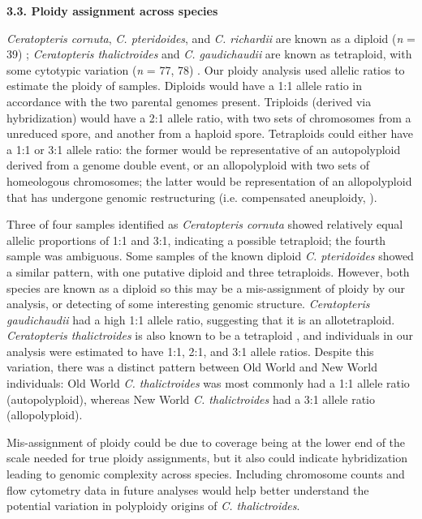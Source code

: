 \documentclass[12pt]{article}
\begin{document}
\begin{flushleft}
\textbf{3.3. Ploidy assignment across species}

\textit{Ceratopteris cornuta}, \textit{C. pteridoides}, and \textit{C. richardii} are known as a diploid (\textit{n} = 39) \autocite{Adjie2007, Hickok1977}; \textit{Ceratopteris thalictroides} and \textit{C. gaudichaudii} are known as tetraploid, with some cytotypic variation (\textit{n} = 77, 78) \autocite{Adjie2007, Masuyama2010}. Our ploidy analysis used allelic ratios to estimate the ploidy of samples. Diploids would have a 1:1 allele ratio in accordance with the two parental genomes present. Triploids (derived via hybridization) would have a 2:1 allele ratio, with two sets of chromosomes from a unreduced spore, and another from a haploid spore. Tetraploids could either have a 1:1 or 3:1 allele ratio: the former would be representative of an autopolyploid derived from a genome double event, or an allopolyploid with two sets of homeologous chromosomes; the latter would be representation of an allopolyploid that has undergone genomic restructuring (i.e. compensated aneuploidy, \cite{Sigel2016}). 

Three of four samples identified as \textit{Ceratopteris cornuta} showed relatively equal allelic proportions of 1:1 and 3:1, indicating a possible tetraploid; the fourth sample was ambiguous. Some samples of the known diploid \textit{C. pteridoides} showed a similar pattern, with one putative diploid and three tetraploids. However, both species are known as a diploid so this may be a mis-assignment of ploidy by our analysis, or detecting of some interesting genomic structure. \textit{Ceratopteris gaudichaudii} had a high 1:1 allele ratio, suggesting that it is an allotetraploid. \textit{Ceratopteris thalictroides} is also known to be a tetraploid \autocite{LloydTax1974, Masuyama2010}, and individuals in our analysis were estimated to have 1:1, 2:1, and 3:1 allele ratios. Despite this variation, there was a distinct pattern between Old World and New World individuals: Old World \textit{C. thalictroides} was most commonly had a 1:1 allele ratio (autopolyploid), whereas New World \textit{C. thalictroides} had a 3:1 allele ratio (allopolyploid). 

Mis-assignment of ploidy could be due to coverage being at the lower end of the scale needed for true ploidy assignments, but it also could indicate hybridization leading to genomic complexity across species. Including chromosome counts and flow cytometry data in future analyses would help better understand the potential variation in polyploidy origins of \textit{C. thalictroides}.


\end{flushleft}
\end{document}
